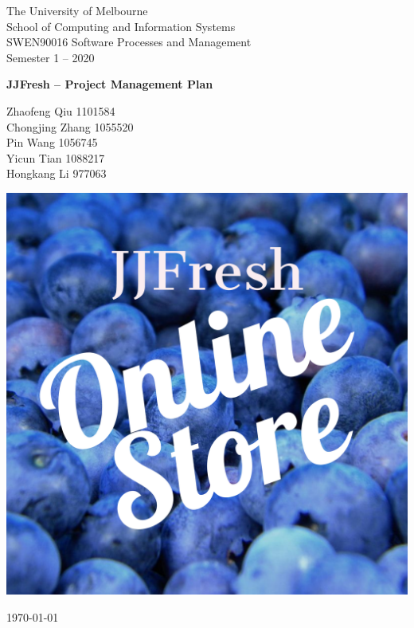 \documentclass{report}
\begin{document}
\begin{titlepage}
	\clearpage\thispagestyle{empty}
	\centering
	\vspace{1cm}

	{\normalsize The University of Melbourne \\ 
		School of Computing and Information Systems \\
		SWEN90016 Software Processes and Management\\
		Semester 1 – 2020 \par}
		\vspace{3cm}
	{\Huge \textbf{JJFresh -- Project Management Plan}} \\
	\vspace{3.5cm}
	{\normalsize Zhaofeng Qiu 1101584\\ %
	             Chongjing Zhang 1055520\\
	             Pin Wang 1056745 \\
	             Yicun Tian 1088217 \\
	             Hongkang Li 977063\par}
	\vspace{3cm}
    
    \centering \includegraphics[scale=0.12]{logo.pdf}
    
    \vspace{0.5cm}
		
	{\normalsize \today \par}
	\pagebreak
\end{titlepage}
\end{document}
